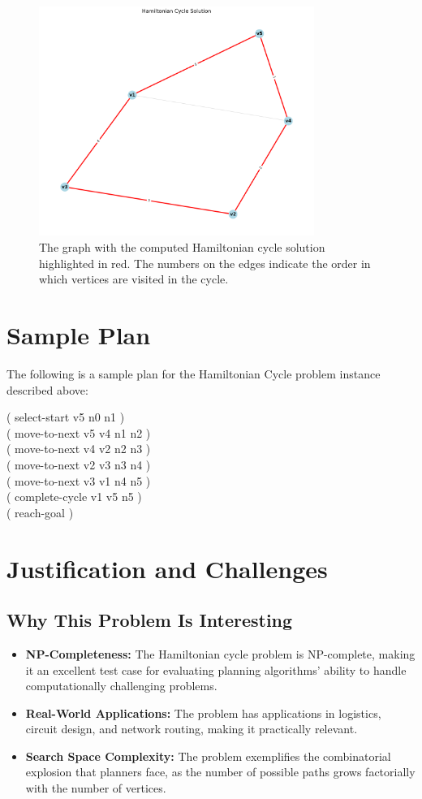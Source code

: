 \documentclass[a4paper,11pt]{article}
\begin{document}
\begin{figure}[htbp]
    \centering
    \includegraphics[width=0.8\textwidth]{../hamiltonian_cycle/problem-small_solution.png}
    \caption{The graph with the computed Hamiltonian cycle solution highlighted in red. The numbers on the edges indicate the order in which vertices are visited in the cycle.}
    \label{fig:graph_solution}
\end{figure}

\section{Sample Plan}
The following is a sample plan for the Hamiltonian Cycle problem instance described above:
\begin{center}
( select-start v5 n0 n1 )\\
( move-to-next v5 v4 n1 n2 )\\
( move-to-next v4 v2 n2 n3 )\\
( move-to-next v2 v3 n3 n4 )\\
( move-to-next v3 v1 n4 n5 )\\
( complete-cycle v1 v5 n5 )\\
( reach-goal )
\end{center}

\section{Justification and Challenges}
\subsection{Why This Problem Is Interesting}
\begin{itemize}
    \item \textbf{NP-Completeness:} The Hamiltonian cycle problem is NP-complete, making it an excellent test case for evaluating planning algorithms' ability to handle computationally challenging problems.
    \item \textbf{Real-World Applications:} The problem has applications in logistics, circuit design, and network routing, making it practically relevant.
    \item \textbf{Search Space Complexity:} The problem exemplifies the combinatorial explosion that planners face, as the number of possible paths grows factorially with the number of vertices.
\end{itemize}
\end{document}
